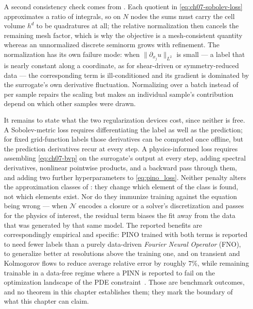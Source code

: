 A second consistency check comes from
. Each quotient in
\eqref{eq:ch07-sobolev-loss} approximates a ratio of integrals, so on $N$ nodes the sums must
carry the cell volume $h^{d}$ to be quadratures at all; the relative normalization then cancels
the remaining mesh factor, which is why the objective is a mesh-consistent quantity whereas an
unnormalized discrete seminorm grows with refinement. The normalization has its own failure
mode: when $\|\partial_{x_j}u\|_{L^2}$ is small --- a label that is nearly constant along a
coordinate, as for shear-driven or symmetry-reduced data --- the corresponding term is
ill-conditioned and its gradient is dominated by the surrogate's own derivative fluctuation.
Normalizing over a batch instead of per sample repairs the scaling but makes an individual
sample's contribution depend on which other samples were drawn.

It remains to state what the two
regularization devices cost, since neither is free. A Sobolev-metric loss requires
differentiating the label as well as the prediction; for fixed grid-function labels those
derivatives can be computed once offline, but the prediction derivatives recur at every
step. A physics-informed loss requires assembling \eqref{eq:ch07-bvp} on the surrogate's
output at every step, adding spectral derivatives, nonlinear pointwise products, and a
backward pass through them, and adding two further hyperparameters to
\eqref{eq:pino_loss}. Neither penalty alters the approximation classes of
: they change which element of
the class is found, not which elements exist. Nor do they immunize training against the
equation being wrong --- when $\mathcal{N}$ encodes a closure or a solver's discretization and
passes for the physics of interest, the residual term biases the fit away from the data that
was generated by that same model. The reported benefits are correspondingly empirical and
specific: PINO trained with both terms is reported to need fewer labels than a purely
data-driven \emph{Fourier Neural Operator} (FNO), to generalize better at resolutions
above the training one, and on transient
and Kolmogorov flows to reduce average relative error by roughly $7\%$, while remaining
trainable in a data-free regime where a PINN is reported to fail on the optimization
landscape of the PDE constraint~\cite{li2021physics}. Those are benchmark
outcomes, and no theorem in this chapter establishes them; they mark the boundary of what this
chapter can claim.

